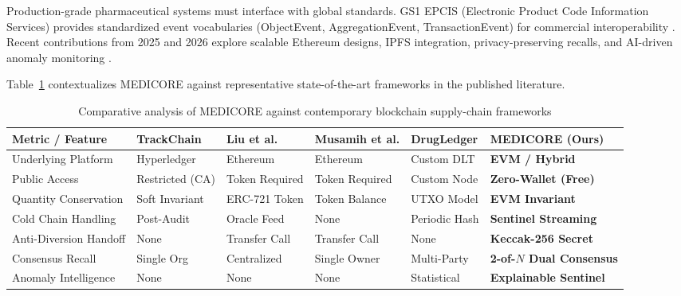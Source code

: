 \documentclass[pdflatex,sn-mathphys-num]{sn-jnl}
\theoremstyle{thmstyleone}
\theoremstyle{thmstyletwo}
\theoremstyle{thmstylethree}
\begin{document}
Production-grade pharmaceutical systems must interface with global standards. GS1 EPCIS (Electronic Product Code Information Services) provides standardized event vocabularies (ObjectEvent, AggregationEvent, TransactionEvent) for commercial interoperability \cite{gs12024epcis,gs12024healthcare,gs12017global}. Recent contributions from 2025 and 2026 explore scalable Ethereum designs, IPFS integration, privacy-preserving recalls, and AI-driven anomaly monitoring \cite{dutta2026blockchain,hasan2026blockchain,rajak2026scalable,drugtrace2026,zk2026privacy,devi2025blockchain,siyal2026traceability}. 

Table~\ref{tab:literature-comparison} contextualizes MEDICORE against representative state-of-the-art frameworks in the published literature.

\begin{table}[htbp]
\centering
\caption{Comparative analysis of MEDICORE against contemporary blockchain supply-chain frameworks}
\label{tab:literature-comparison}
\vspace{0.5em}
\begin{tabularx}{\textwidth}{lXXXXX}
\toprule
\textbf{Metric / Feature} & \textbf{TrackChain \cite{nagasudha2024trackchain}} & \textbf{Liu et al. \cite{liu2021blockchain}} & \textbf{Musamih et al. \cite{musamih2021blockchain}} & \textbf{DrugLedger \cite{dutta2026blockchain}} & \textbf{MEDICORE (Ours)} \\
\midrule
Underlying Platform & Hyperledger & Ethereum & Ethereum & Custom DLT & \textbf{EVM / Hybrid} \\
Public Access & Restricted (CA) & Token Required & Token Required & Custom Node & \textbf{Zero-Wallet (Free)} \\
Quantity Conservation & Soft Invariant & ERC-721 Token & Token Balance & UTXO Model & \textbf{EVM Invariant} \\
Cold Chain Handling & Post-Audit & Oracle Feed & None & Periodic Hash & \textbf{Sentinel Streaming} \\
Anti-Diversion Handoff & None & Transfer Call & Transfer Call & None & \textbf{Keccak-256 Secret} \\
Consensus Recall & Single Org & Centralized & Single Owner & Multi-Party & \textbf{2-of-$N$ Dual Consensus} \\
Anomaly Intelligence & None & None & None & Statistical & \textbf{Explainable Sentinel} \\
\bottomrule
\end{tabularx}
\end{table}
\end{document}
